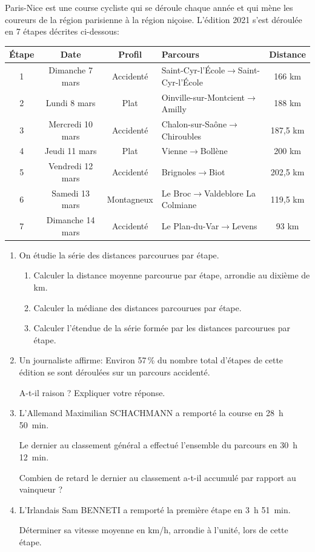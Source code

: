 \documentclass[exercice,a4]{thedocument}%
\begin{document}
%

\medskip

Paris-Nice est une course cycliste qui se déroule chaque année et qui mène les coureurs de la région parisienne à la région niçoise. L'édition 2021 s'est déroulée en 7 étapes décrites ci-dessous:

\begin{center}
\begin{tabularx}{\linewidth}{|c|c|c|>{\small}X|c|}\hline
\textbf{Étape} &\textbf{Date}&\textbf{Profil}&\textbf{Parcours}&\textbf{Distance}
\\ \hline
1&Dimanche 7 mars&Accidenté&\footnotesize Saint-Cyr-l'École$\to$Saint-Cyr-l'École&166 km\\ \hline
2&Lundi 8 mars&Plat&Oinville-sur-Montcient$\to$Amilly&188 km\\ \hline
3&Mercredi 10 mars&Accidenté& Chalon-sur-Saône$\to$Chiroubles&187,5 km\\ \hline
4&Jeudi 11 mars &Plat&Vienne$\to$Bollène&200 km\\ \hline
5&Vendredi 12 mars&Accidenté&Brignoles$\to$Biot&202,5 km\\ \hline
6&Samedi 13 mars&Montagneux&Le Broc$\to$Valdeblore La Colmiane&119,5 km\\ \hline
7&Dimanche 14 mars&Accidenté& Le Plan-du-Var$\to$Levens&93 km\\ \hline
\end{tabularx}
\end{center}

\begin{enumerate}
\item On étudie la série des distances parcourues par étape.
	\begin{enumerate}
		\item Calculer la distance moyenne parcourue par étape, arrondie au dixième de km.
		\item Calculer la médiane des distances parcourues par étape.
		\item Calculer l'étendue de la série formée par les distances parcourues par étape.
	\end{enumerate}
\item Un journaliste affirme: \og Environ 57\,\% du nombre total d'étapes de cette édition se sont déroulées sur un parcours accidenté. \fg{}

A-t-il raison ? Expliquer votre réponse.
\item L'Allemand Maximilian SCHACHMANN a remporté la course en 28~h 50~min.

Le dernier au classement général a effectué l'ensemble du parcours en 30~h 12~min.

Combien de retard le dernier au classement a-t-il accumulé par rapport au vainqueur ?
\item L'Irlandais Sam BENNETI a remporté la première étape en 3~h 51~min.

Déterminer sa vitesse moyenne en km/h, arrondie à l'unité, lors de cette étape.
\end{enumerate}

\medskip

\showthesource
\end{document}
